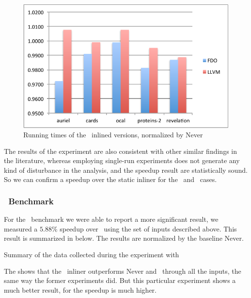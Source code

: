 \begin{figure}
  \centering
  \includegraphics[width=1.00\linewidth]{Figures/speedup}
  \caption{Running times of the \gzip\ inlined versions, normalized by Never}
  \label{fig:speedupz}
\end{figure}

The results of the experiment are also consistent with other similar findings in the literature, whereas employing single-run experiments does not generate any kind of disturbance in the analysis, and the speedup result are statistically sound. So we can confirm a speedup over the static inliner for the \bzip\ and \gzip\ cases.

\subsubsection{\Gcc\ Benchmark}

For the \gcc\ benchmark we were able to report a more significant result, we measured a $5.88 \%$ speedup over \llvm\ using the set of inputs described above. This result is summarized in  below. The results are normalized by the baseline Never.

\begin{table}
  \centering
  \begin{tiny}
  
  \end{tiny}
  \caption{Summary of the data collected during the experiment with \gcc}
  \label{tab:speedupgcc}
\end{table}

The  shows that the \FDI\ inliner outperforms Never and \llvm\ through all the inputs, the same way the former experiments did. But this particular experiment shows a much better result, for the speedup is much higher.

